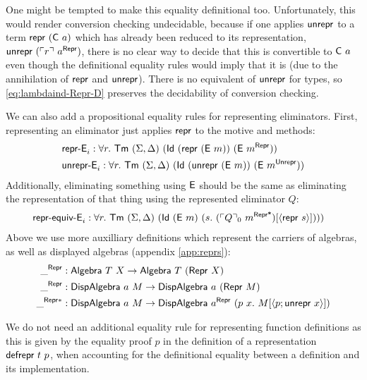 One might be tempted to make this equality definitional too. Unfortunately, this
would render conversion checking undecidable, because if one applies
$\textsf{unrepr}$ to a term $\textsf{repr}\ (\textsf{C}\ a)$ which has already been reduced
to its representation, $\textsf{unrepr}\ (\ulcorner r \urcorner\ a^{\textsf{Repr}})$, there is no
clear way to decide that this is convertible to $\textsf{C}\ a$ even though the
definitional equality rules would imply that it is (due
to the annihilation of $\textsf{repr}$ and $\textsf{unrepr}$). There is no
equivalent of $\textsf{unrepr}$ for types, so \eqref{eq:lambdaind-Repr-D} preserves
the decidability of conversion checking.


We can also add a propositional equality rules for representing eliminators.
First, representing an eliminator just applies $\textsf{repr}$ to the motive and methods:
\begin{align*}
&\mta{repr-E}_i : \forall r.\ \Tm\ (\Sigma, \Delta)\ (\mta{Id}\ (\Mrepr\ (\mta{E}\ m))\ (\mta{E}\ m^\mta{Repr})) \\
&\mta{unrepr-E}_i : \forall r.\ \Tm\ (\Sigma, \Delta)\ (\mta{Id}\ (\Munrepr\ (\mta{E}\ m))\ (\mta{E}\ m^\mta{Unrepr}))
\end{align*}
Additionally, eliminating something using $\textsf{E}$ should be the same as
eliminating the representation of that thing using the represented eliminator $Q$:
\begin{align*}
&\mta{repr-equiv-E}_i : \forall r.\ \Tm\ (\Sigma, \Delta)\ (\mta{Id}\ (\mta{E}\ m)\ (s.\ (\emb{Q}_0\ m^{\mta{Repr*}})[\Msub{\mta{repr}\ s}])))
\end{align*}
Above we use more auxilliary definitions which represent the carriers of
algebras, as well as displayed algebras (appendix \cref{app:reprs}):
\begin{align*}
\_^{\mta{Repr}} &: \mta{Algebra}\ T\ X \to \mta{Algebra}\ T\ (\mta{Repr}\ X) \\
 \_^{\mta{Repr}} &: \mta{DispAlgebra}\ a\ M \to \mta{DispAlgebra}\ a\ (\MRepr\ M) \\
 \_^{\mta{Repr}*} &: \mta{DispAlgebra}\ a\ M \to \mta{DispAlgebra}\ a^{\mta{Repr}}\ (p\ x .\ M[\Msub{p;\mta{unrepr}\ x}])
\end{align*}

We do not need an additional equality rule for representing function definitions
as this is given by the equality proof $p$ in the definition of a
representation $\textsf{defrepr}\ t\ p$, when accounting for the definitional
equality between a definition and its implementation.

